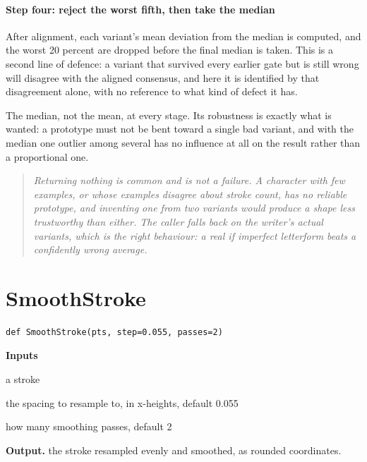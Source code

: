 \paragraph{Step four: reject the worst fifth, then take the median}
After alignment, each variant's mean deviation from the median is computed, and the worst 20 percent are dropped before the final median is taken. This is a second line of defence: a variant that survived every earlier gate but is still wrong will disagree with the aligned consensus, and here it is identified by that disagreement alone, with no reference to what kind of defect it has.

The median, not the mean, at every stage. Its robustness is exactly what is wanted: a prototype must not be bent toward a single bad variant, and with the median one outlier among several has no influence at all on the result rather than a proportional one.


\begin{quote}\small\itshape Returning nothing is common and is not a failure. A character with few examples, or whose examples disagree about stroke count, has no reliable prototype, and inventing one from two variants would produce a shape less trustworthy than either. The caller falls back on the writer's actual variants, which is the right behaviour: a real if imperfect letterform beats a confidently wrong average.\end{quote}

\section{SmoothStroke}
\begin{lstlisting}[style=sig]
def SmoothStroke(pts, step=0.055, passes=2)
\end{lstlisting}

\noindent\textbf{Inputs}
\begin{description}[leftmargin=2.2em,style=nextline,font=\normalfont\ttfamily]\setlength\itemsep{1pt}
  \item[{pts}] \normalfont a stroke
  \item[{step}] \normalfont the spacing to resample to, in x-heights, default 0.055
  \item[{passes}] \normalfont how many smoothing passes, default 2
\end{description}

\noindent\textbf{Output.} the stroke resampled evenly and smoothed, as rounded coordinates.


